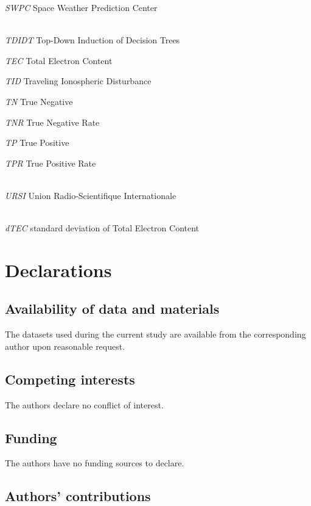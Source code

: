\let\LaTeXcline\cline\documentclass[sn-mathphys-num]{sn-jnl}\let\cline\LaTeXcline
\begin{document}
\textit{SWPC} Space Weather Prediction Center


\\[2\baselineskip]

\textit{TDIDT} Top-Down Induction of Decision Trees

\textit{TEC} Total Electron Content

\textit{TID} Traveling Ionospheric Disturbance

\textit{TN} True Negative

\textit{TNR} True Negative Rate

\textit{TP} True Positive

\textit{TPR} True Positive Rate


\\[2\baselineskip]

\textit{URSI} Union Radio-Scientifique Internationale


\\[2\baselineskip]

\textit{dTEC} standard deviation of Total Electron Content



\section{Declarations}

\subsection{Availability of data and materials}

The datasets used during the current study are available from the corresponding author upon reasonable request.

\subsection{Competing interests}

The authors declare no conflict of interest.

\subsection{Funding}

The authors have no funding sources to declare.

\subsection{Authors' contributions}
\end{document}
